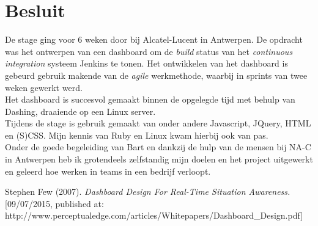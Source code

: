 \documentclass[10pt,a4paper]{article}
\begin{document}
\section{Besluit}
\label{besluit}
De stage ging voor 6 weken door bij Alcatel-Lucent in Antwerpen. De opdracht was het ontwerpen van een dashboard om de \textit{build} status van het \textit{continuous integration} systeem Jenkins te tonen. Het ontwikkelen van het dashboard is gebeurd gebruik makende van de \textit{agile} werkmethode, waarbij in sprints van twee weken gewerkt werd.\\
Het dashboard is succesvol gemaakt binnen de opgelegde tijd met behulp van Dashing, draaiende op een Linux server.\\
Tijdens de stage is gebruik gemaakt van onder andere Javascript, JQuery, HTML en (S)CSS. Mijn kennis van Ruby en Linux kwam hierbij ook van pas.\\
Onder de goede begeleiding van Bart en dankzij de hulp van de mensen bij NA-C in Antwerpen heb ik grotendeels zelfstandig mijn doelen en het project uitgewerkt en geleerd hoe werken in teams in een bedrijf verloopt.

\clearpage

\begin{thebibliography}{11} 

 Stephen Few (2007). \emph{Dashboard Design For Real-Time Situation Awareness.} [09/07/2015, published at: http://www.perceptualedge.com/articles/Whitepapers/Dashboard\_Design.pdf]

\end{thebibliography}
\end{document}
